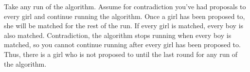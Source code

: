 \documentclass[11pt]{article}
\begin{document}
\begin{problems}
\begin{longFormProof}
  \end{longFormProof}

  \begin{shortFormProof}
    Take any run of the algorithm. Assume for contradiction you've had proposals to every girl and continue running the algorithm. Once a girl has been proposed to, she will be matched for the rest of the run. If every girl is matched, every boy is also matched. Contradiction, the algorithm stops running when every boy is matched, so you cannot continue running after every girl has been proposed to. Thus, there is a girl who is not proposed to until the last round for any run of the algorithm.
  \end{shortFormProof}

\end{problems}
\end{document}
